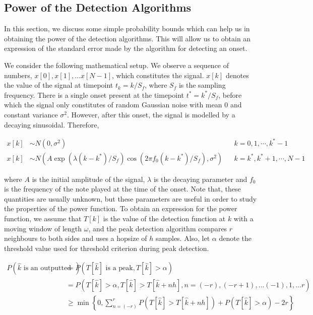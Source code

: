 \documentclass[10pt]{article}
\begin{document}
\subsection{Power of the Detection Algorithms}
\qquad In this section, we discuss some simple probability bounds which can help us in obtaining the power of the detection algorithms. This will allow us to obtain an expression of the standard error made by the algorithm for detecting an onset. 

We consider the following mathematical setup. We observe a sequence of numbers, $x[0], x[1], \dots x[N-1]$, which constitutes the signal. $x[k]$ denotes the value of the signal at timepoint $t_k = k/S_f$, where $S_f$ is the sampling frequency. There is a single onset present at the timepoint $t^* = k^*/S_f$, before which the signal only constitutes of random Gaussian noise with mean $0$ and constant variance $\sigma^2$. However, after this onset, the signal is modelled by a decaying sinusoidal. Therefore,

\begin{align*}
 x[k] & \sim N(0, \sigma^2) &&  k=0,1,\cdots, k^*-1\\ 
 x[k] & \sim N(A\exp{(\lambda(k-k^*)/S_f)}\cos{\left(2\pi f_0(k - k^*)/S_f\right)}, \sigma^2) && k=k^*,k^* + 1,\cdots, N-1 
 \end{align*}

where $A$ is the initial amplitude of the signal, $\lambda$ is the decaying parameter and $f_0$ is the frequency of the note played at the time of the onset. Note that, these quantities are usually unknown, but these parameters are useful in order to study the properties of the power function. To obtain an expression for the power function, we assume that $T[k]$ is the value of the detection function at $k$ with a moving window of length $\omega$, and the peak detection algorithm compares $r$ neighbours to both sides and uses a hopsize of $h$ samples. Also, let $\alpha$ denote the threshold value used for threshold criterion during peak detection.

\begin{align*}
    P\left(\hat{k}\text{ is an outputted onset}\right) & = P\left(T[\hat{k}]\text{ is a peak}, T[\hat{k}] > \alpha\right)\\
    & = P\left(T[\hat{k}] > \alpha, T[\hat{k}] > T[\hat{k} + nh], n = (-r), (-r+1), \dots (-1), 1, \dots r\right)\\
    & \geq \min\left\{0, \sum_{n=(-r)}^{r}P(T[\hat{k}] > T[\hat{k} + nh]) + P(T[\hat{k}] > \alpha) - 2r\right\}
\end{align*}
\end{document}
